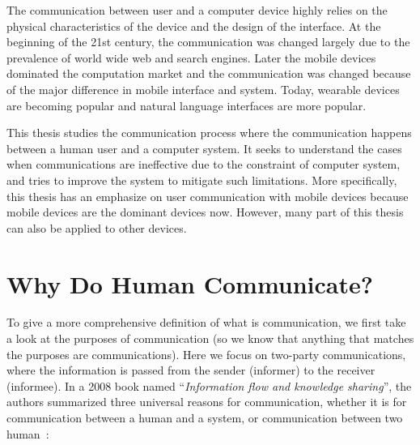 The communication between user and a computer device highly relies on the physical characteristics of the device and the design of the interface. At the beginning of the 21st century, the communication was changed largely due to the prevalence of world wide web and search engines. Later the mobile devices dominated the computation market and the communication was changed because of the major difference in mobile interface and system. Today, wearable devices are becoming popular and natural language interfaces are more popular. 

This thesis studies the communication process where the communication happens between a human user and a computer system. It seeks to understand the cases when communications are ineffective due to the constraint of computer system, and tries to improve the system to mitigate such limitations. More specifically, this thesis has an emphasize on user communication with mobile devices because mobile devices are the dominant devices now. However, many part of this thesis can also be applied to other devices. 

\section{Why Do Human Communicate?}
\label{sec:ch1:why}

To give a more comprehensive definition of what is communication, we first take a look at the purposes of communication (so we know that anything that matches the purposes are communications). Here we focus on two-party communications, where the information is passed from the sender (informer) to the receiver (informee). In a 2008 book named ``\textit{Information flow and knowledge sharing}'', the authors summarized three universal reasons for communication, whether it is for communication between a human and a system, or communication between two human~\cite{da2008information}:

